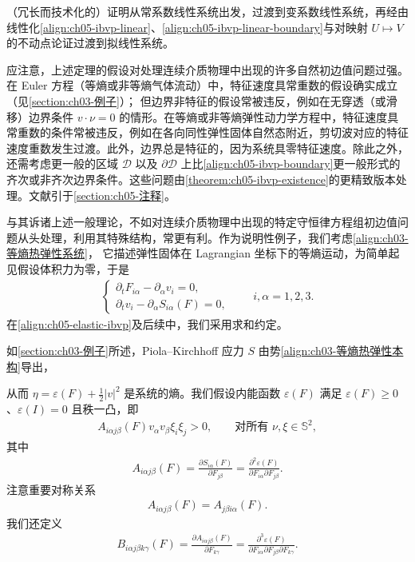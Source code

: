 \documentclass[../../main.tex]{subfiles}
\begin{document}
（冗长而技术化的）证明从常系数线性系统出发，过渡到变系数线性系统，再经由线性化\eqref{align:ch05-ibvp-linear}、\eqref{align:ch05-ibvp-linear-boundary}与对映射 $U\mapsto V$ 的不动点论证过渡到拟线性系统。

应注意，上述定理的假设对处理连续介质物理中出现的许多自然初边值问题过强。在 Euler 方程（等熵或非等熵气体流动）中，特征速度具常重数的假设确实成立（见\cref{section:ch03-例子}）；
但边界非特征的假设常被违反，例如在无穿透（或滑移）边界条件 $v\cdot\nu=0$ 的情形。在等熵或非等熵弹性动力学方程中，特征速度具常重数的条件常被违反，例如在各向同性弹性固体自然态附近，剪切波对应的特征速度重数发生过渡。此外，边界总是特征的，因为系统具零特征速度。除此之外，还需考虑更一般的区域 $\mathscr{D}$ 以及 $\partial\mathscr{D}$ 上比\eqref{align:ch05-ibvp-boundary}更一般形式的齐次或非齐次边界条件。这些问题由\cref{theorem:ch05-ibvp-existence}的更精致版本处理。文献引于\cref{section:ch05-注释}。

与其诉诸上述一般理论，不如对连续介质物理中出现的特定守恒律方程组初边值问题从头处理，利用其特殊结构，常更有利。作为说明性例子，我们考虑\eqref{align:ch03-等熵热弹性系统}，
它描述弹性固体在 Lagrangian 坐标下的等熵运动，为简单起见假设体积力为零，于是
\begin{align}
\begin{cases}
\partial_{t}F_{i\alpha}-\partial_{\alpha}v_{i}=0,\\
\partial_{t}v_{i}-\partial_{\alpha}S_{i\alpha}(F)=0,
\end{cases}\qquad i,\alpha=1,2,3.\label{align:ch05-elastic-ibvp}
\end{align}
在\eqref{align:ch05-elastic-ibvp}及后续中，我们采用求和约定。

如\cref{section:ch03-例子}所述，Piola--Kirchhoff 应力 $S$ 由势\eqref{align:ch03-等熵热弹性本构}导出，

从而 $\eta=\varepsilon(F)+\frac{1}{2}|v|^{2}$ 是系统的熵。我们假设内能函数 $\varepsilon(F)$ 满足 $\varepsilon(F)\geqslant0$、$\varepsilon(I)=0$ 且秩一凸，即
\begin{align}
A_{i\alpha j\beta}(F)v_{\alpha}v_{\beta}\xi_{i}\xi_{j}>0,\qquad\text{对所有 }\nu,\xi\in\mathbb{S}^{2},\label{align:ch05-rank-one-convex}
\end{align}
其中
\begin{align}
A_{i\alpha j\beta}(F)=\frac{\partial S_{i\alpha}(F)}{\partial F_{j\beta}}=\frac{\partial^{2}\varepsilon(F)}{\partial F_{i\alpha}\partial F_{j\beta}}.\label{align:ch05-A-elastic}
\end{align}
注意重要对称关系
\begin{align}
A_{i\alpha j\beta}(F)=A_{j\beta i\alpha}(F).\label{align:ch05-A-symmetry}
\end{align}
我们还定义
\begin{align}
B_{i\alpha j\beta k\gamma}(F)=\frac{\partial A_{i\alpha j\beta}(F)}{\partial F_{k\gamma}}=\frac{\partial^{3}\varepsilon(F)}{\partial F_{i\alpha}\partial F_{j\beta}\partial F_{k\gamma}}.\label{align:ch05-B-elastic}
\end{align}
\end{document}
